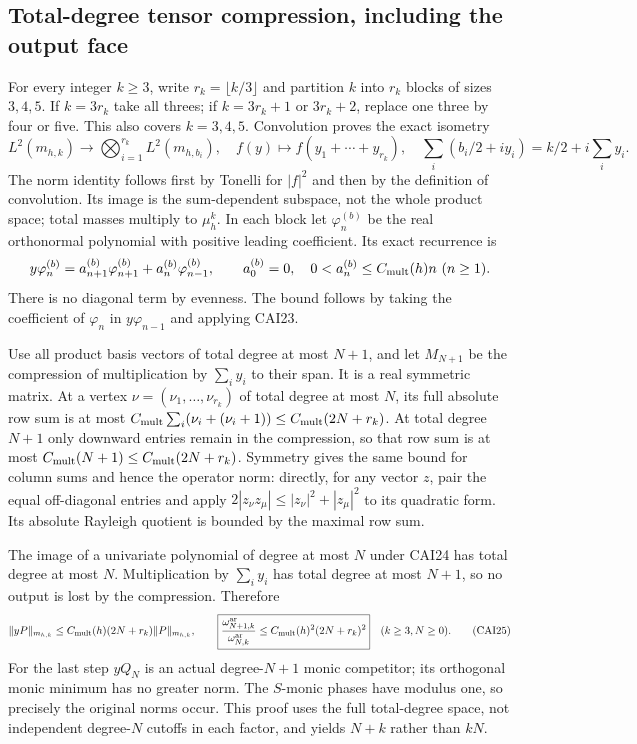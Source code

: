 \documentclass[11pt,a4paper]{article}
\begin{document}
\subsection{Total-degree tensor compression, including the output face}

For every integer $k\ge3$, write $r_k=\lfloor k/3\rfloor$ and
partition $k$ into $r_k$ blocks of sizes $3,4,5$. If $k=3r_k$ take
all threes; if $k=3r_k+1$ or $3r_k+2$, replace one three by four or
five. This also covers $k=3,4,5$. Convolution proves the exact isometry
\[
 L^2(m_{h,k})\longrightarrow\bigotimes_{i=1}^{r_k}L^2(m_{h,b_i}),
 \quad f(y)\longmapsto f(y_1+\cdots+y_{r_k}),\quad
 \sum_i(b_i/2+iy_i)=k/2+i\sum_iy_i.\tag{CAI24}
\]
The norm identity follows first by Tonelli for $|f|^2$ and then by
the definition of convolution. Its image is the sum-dependent
subspace, not the whole product space; total masses multiply to
$\mu_h^k$. In each block let $\varphi_n^{(b)}$ be the real orthonormal
polynomial with positive leading coefficient. Its exact recurrence is
\[
 y\varphi_n^{(b)}=a_{n+1}^{(b)}\varphi_{n+1}^{(b)}
                         +a_n^{(b)}\varphi_{n-1}^{(b)},\qquad
 a_0^{(b)}=0,\quad 0<a_n^{(b)}\le C_{\rm mult}(h)n\ (n\ge1).
\]
There is no diagonal term by evenness. The bound follows by taking
the coefficient of $\varphi_n$ in $y\varphi_{n-1}$ and applying CAI23.

Use all product basis vectors of total degree at most $N+1$, and let
$M_{N+1}$ be the compression of multiplication by $\sum_i y_i$ to
their span. It is a real symmetric matrix. At a vertex
$\nu=(\nu_1,\ldots,\nu_{r_k})$ of total degree at most $N$, its full
absolute row sum is at most
$C_{\rm mult}\sum_i(\nu_i+(\nu_i+1))\le C_{\rm mult}(2N+r_k)$.
At total degree $N+1$ only downward entries remain in the compression,
so that row sum is at most $C_{\rm mult}(N+1)\le C_{\rm mult}(2N+r_k)$.
Symmetry gives the same bound for column sums and hence the operator
norm: directly, for any vector $z$, pair the equal off-diagonal entries
and apply $2|z_\nu z_\mu|\le|z_\nu|^2+|z_\mu|^2$ to its quadratic
form. Its absolute Rayleigh quotient is bounded by the maximal row sum.

The image of a univariate polynomial of degree at most $N$ under CAI24
has total degree at most $N$. Multiplication by $\sum_i y_i$ has total
degree at most $N+1$, so no output is lost by the compression. Therefore
\[
 \|yP\|_{m_{h,k}}\le C_{\rm mult}(h)(2N+r_k)\|P\|_{m_{h,k}},\qquad
 \boxed{\frac{\omega_{N+1,k}^{\rm ar}}{\omega_{N,k}^{\rm ar}}
         \le C_{\rm mult}(h)^2(2N+r_k)^2}\quad(k\ge3,N\ge0).
 \tag{CAI25}
\]
For the last step $yQ_N$ is an actual degree-$N+1$ monic competitor;
its orthogonal monic minimum has no greater norm. The $S$-monic phases
have modulus one, so precisely the original norms occur. This proof
uses the full total-degree space, not independent degree-$N$ cutoffs
in each factor, and yields $N+k$ rather than $kN$.
\end{document}

